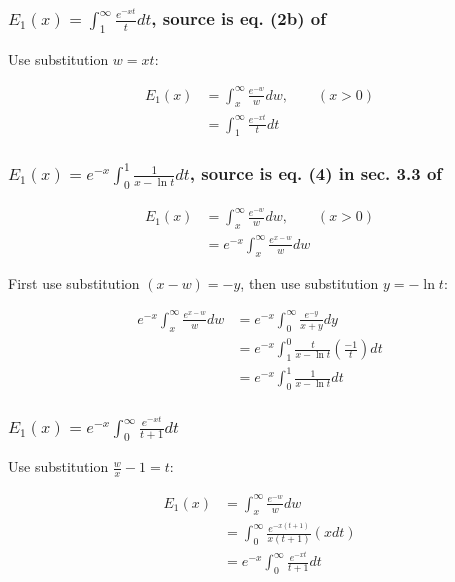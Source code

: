 \documentclass[bibliography=totocnumbered]{scrartcl}
\newcommand{\assume}[1][\text{MISSING PARAMETER}]{,\qquad\left(#1\right)}
\begin{document}
	\subsubsection[A integral representation not involving x in the integral limits]{$E_1\left(x\right)=\int_{1}^{\infty}\frac{e^{-xt}}{t}dt$, source is eq. (2b) of \cite{boer1990calc}}
	\label{subsubsec: def01}
	
	Use substitution $w=xt$:
	
	\begin{align}
		E_1\left(x\right)&=\int_{x}^{\infty}\frac{e^{-w}}{w}dw\assume[x>0]\\
		&=\int_{1}^{\infty}\frac{e^{-xt}}{t}dt
	\end{align}
	
	\subsubsection[A integral representation not involving exp(x) in the integrand]{$E_1\left(x\right)=e^{-x}\int_{0}^{1}\frac{1}{x-\ln{t}}dt$, source is eq. (4) in sec. 3.3 of \cite{geller1969table}}
	\label{subsubsec: intrep01}
	\begin{align}
		E_1\left(x\right)&=\int_{x}^{\infty}\frac{e^{-w}}{w}dw\assume[x>0]\\
		&=e^{-x}\int_{x}^{\infty}\frac{e^{x-w}}{w}dw
	\end{align}
	
	First use substitution $\left(x-w\right)=-y$, then use substitution $y=-\ln{t}$:
	
	\begin{align}
		e^{-x}\int_{x}^{\infty}\frac{e^{x-w}}{w}dw&=e^{-x}\int_{0}^{\infty}\frac{e^{-y}}{x+y}dy\\
		&=e^{-x}\int_{1}^{0}\frac{t}{x-\ln{t}}\left(\frac{-1}{t}\right)dt\\
		&=e^{-x}\int_{0}^{1}\frac{1}{x-\ln{t}}dt
	\end{align}
	
	\subsubsection[A integral representation]{$E_1\left(x\right)=e^{-x}\int_{0}^{\infty}\frac{e^{-xt}}{t+1}dt$}
	\label{subsubsec: intrep02}
	
	Use substitution $\frac{w}{x}-1=t$:
	
	\begin{align}
		E_1\left(x\right)&=\int_{x}^{\infty}\frac{e^{-w}}{w}dw\\
		&=\int_{0}^{\infty}\frac{e^{-x\left(t+1\right)}}{x\left(t+1\right)}\left(xdt\right)\\
		&=e^{-x}\int_{0}^{\infty}\frac{e^{-xt}}{t+1}dt
	\end{align}
	
\end{document}
